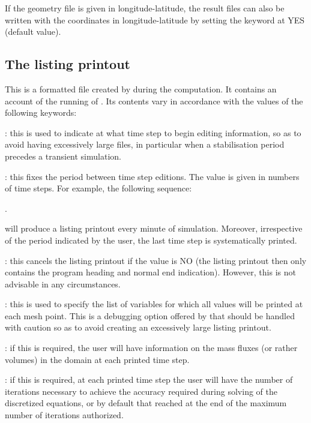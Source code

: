 If the geometry file is given in longitude-latitude, the result files
can also be written with the coordinates in longitude-latitude
by setting the keyword 
at YES (default value).

\subsection{ The listing printout}

 This is a formatted file created by  during the computation. It contains an account of the running of . Its contents vary in accordance with the values of the following keywords:

 : this is used to indicate at what time step to begin editing information, so as to avoid having excessively large files, in particular when a stabilisation period precedes a transient simulation.

 : this fixes the period between time step editions. The value is given in numbers of time steps. For example, the following sequence:

    .


 will produce a listing printout every minute of simulation. Moreover, irrespective of the period indicated by the user, the last time step is systematically printed.

 : this cancels the listing printout if the value is NO (the listing printout then only contains the program heading and normal end indication). However, this is not advisable in any circumstances.

 : this is used to specify the list of variables for which all values will be printed at each mesh point. This is a debugging option offered by  that should be handled with caution so as to avoid creating an excessively large listing printout.

 : if this is required, the user will have information on the mass fluxes (or rather volumes) in the domain at each printed time step.

 : if this is required, at each printed time step the user will have the number of iterations necessary to achieve the accuracy required during solving of the discretized equations, or by default that reached at the end of the maximum number of iterations authorized.

